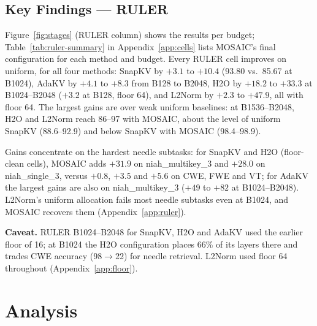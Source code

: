 \documentclass[11pt]{article}
\begin{document}
\subsection{Key Findings — RULER}
\label{sec:ruler}

Figure~\ref{fig:stages} (RULER column) shows the results per budget; Table~\ref{tab:ruler-summary} in Appendix~\ref{app:cells} lists MOSAIC's final configuration for each method and budget. Every RULER cell improves on uniform, for all four methods: SnapKV by $+3.1$ to $+10.4$ (93.80 vs.\ 85.67 at B1024), AdaKV by $+4.1$ to $+8.3$ from B128 to B2048, H2O by $+18.2$ to $+33.3$ at B1024--B2048 ($+3.2$ at B128, floor 64), and L2Norm by $+2.3$ to $+47.9$, all with floor 64. The largest gains are over weak uniform baselines: at B1536--B2048, H2O and L2Norm reach 86--97 with MOSAIC, about the level of uniform SnapKV (88.6--92.9) and below SnapKV with MOSAIC (98.4--98.9).

Gains concentrate on the hardest needle subtasks: for SnapKV and H2O (floor-clean cells), MOSAIC adds $+31.9$ on niah\_multikey\_3 and $+28.0$ on niah\_single\_3, versus $+0.8$, $+3.5$ and $+5.6$ on CWE, FWE and VT; for AdaKV the largest gains are also on niah\_multikey\_3 ($+49$ to $+82$ at B1024--B2048). L2Norm's uniform allocation fails most needle subtasks even at B1024, and MOSAIC recovers them (Appendix~\ref{app:ruler}).

\textbf{Caveat.} RULER B1024--B2048 for SnapKV, H2O and AdaKV used the earlier floor of 16; at B1024 the H2O configuration places 66\% of its layers there and trades CWE accuracy (98$\rightarrow$22) for needle retrieval. L2Norm used floor 64 throughout (Appendix~\ref{app:floor}).




\section{Analysis}

\end{document}
